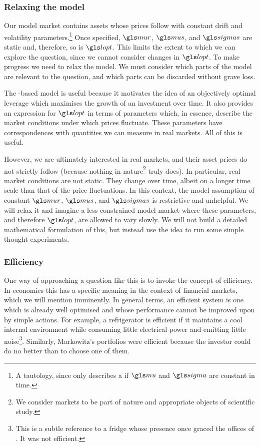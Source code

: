 \subsubsection{Relaxing the model}
Our model market contains assets whose prices follow \GBM with constant drift and volatility parameters.\footnote{A tautology, since  only describes a \GBM if $\gmu$ and $\gsigma$ are constant in time.} Once specified, $\mur$, $\mus$, and $\sigmas$ are static and, therefore, so is $\lopt$. This limits the extent to which we can explore the question, since we cannot consider changes in $\lopt$. To make progress we need to relax the model. We must consider which parts of the model are relevant to the question, and which parts can be discarded without grave loss.

The \GBM-based model is useful because it motivates the idea of an objectively optimal leverage which maximises the growth of an investment over time. It also provides an expression for $\lopt$ in terms of parameters which, in essence, describe the market conditions under which prices fluctuate. These parameters have correspondences with quantities we can measure in real markets. All of this is useful.

However, we are ultimately interested in real markets, and their asset prices do not strictly follow \GBM (because nothing in nature\footnote{We consider markets to be part of nature and appropriate objects of scientific study.} truly does). In particular, real market conditions are not static. They change over time, albeit on a longer time scale than that of the price fluctuations. In this context, the model assumption of constant $\mur$, $\mus$, and $\sigmas$ is restrictive and unhelpful. We will relax it and imagine a less constrained model market where these parameters, and therefore $\lopt$, are allowed to vary slowly. We will not build a detailed mathematical formulation of this, but instead use the idea to run some simple thought experiments.

\subsubsection{Efficiency}
One way of approaching a question like this is to invoke the concept of efficiency. In economics this has a specific meaning in the context of financial markets, which we will mention imminently. In general terms, an efficient system is one which is already well optimised and whose performance cannot be improved upon by simple actions. For example, a refrigerator is efficient if it maintains a cool internal environment while consuming little electrical power and emitting little noise\footnote{This is a subtle reference to a fridge whose presence once graced the offices of \LML. It was not efficient.}. Similarly, Markowitz's portfolios were efficient because the investor could do no better than to choose one of them. 

